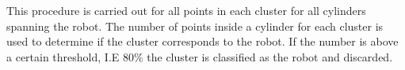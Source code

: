This procedure is carried out for all points in each cluster for all cylinders spanning the robot. The number of points inside a cylinder for each cluster is used to determine if the cluster corresponds to the robot. If the number is above a certain threshold, I.E 80\% the cluster is classified as the robot and discarded.
